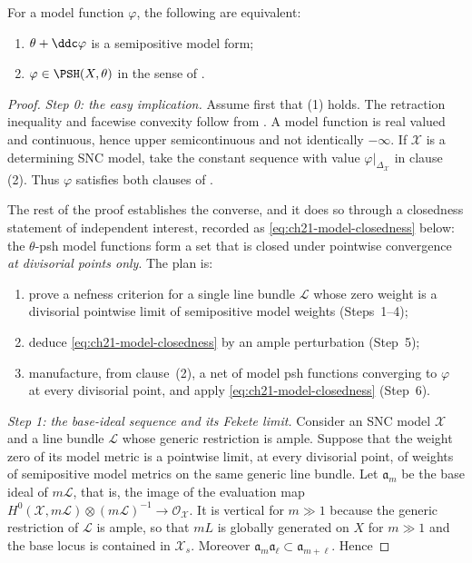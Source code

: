 \begin{theorem}\label{thm:ch21-model-consistency}
For a model function \(\varphi\), the following are equivalent:

\begin{enumerate}
\item \(\theta+\ddc\varphi\) is a semipositive model form;
\item \(\varphi\in\PSH(X,\theta)\) in the sense of
.
\end{enumerate}
\end{theorem}

\begin{proof}
\emph{Step 0: the easy implication.}
Assume first that (1) holds.  The retraction inequality and facewise
convexity follow from .  A model
function is real valued and continuous, hence upper semicontinuous and not
identically \(-\infty\).  If
\(\mathcal X\) is a determining SNC model, take the constant sequence with
value \(\varphi|_{\Delta_{\mathcal X}}\) in clause (2).  Thus
\(\varphi\) satisfies both clauses of .

The rest of the proof establishes the converse, and it does so through a
closedness statement of independent interest, recorded as
\eqref{eq:ch21-model-closedness} below: the \(\theta\)-psh model functions
form a set that is closed under pointwise convergence \emph{at divisorial
points only}.  The plan is:
\begin{enumerate}
\item[(a)] prove a nefness criterion for a single line bundle
\(\mathcal L\) whose zero weight is a divisorial pointwise limit of
semipositive model weights (Steps~1--4);
\item[(b)] deduce \eqref{eq:ch21-model-closedness} by an ample perturbation
(Step~5);
\item[(c)] manufacture, from clause~(2), a net of model psh functions
converging to \(\varphi\) at every divisorial point, and apply
\eqref{eq:ch21-model-closedness} (Step~6).
\end{enumerate}

\emph{Step 1: the base-ideal sequence and its Fekete limit.}
Consider
an SNC model \(\mathcal X\) and a line bundle \(\mathcal L\) whose generic
restriction is ample.  Suppose that the weight zero of its model metric is a
pointwise limit, at every divisorial point, of weights of semipositive model
metrics on the same generic line bundle.  Let \(\mathfrak a_m\) be the base
ideal of \(m\mathcal L\), that is, the image of the evaluation map
\(H^0(\mathcal X,m\mathcal L)\otimes(m\mathcal L)^{-1}\to
\mathcal O_{\mathcal X}\).  It is vertical for \(m\gg1\) because the generic
restriction of \(\mathcal L\) is ample, so that \(mL\) is globally generated
on \(X\) for \(m\gg1\) and the base locus is contained in
\(\mathcal X_s\).  Moreover
\(\mathfrak a_m\mathfrak a_\ell\subset\mathfrak a_{m+\ell}\).  Hence


\end{proof}
